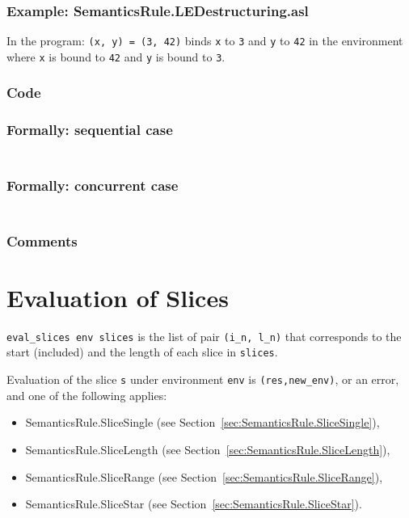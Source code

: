 \documentclass{book}
\begin{document}
    \subsection{Example: SemanticsRule.LEDestructuring.asl}
    In the program:
    \texttt{(x, y) = (3, 42)} binds \texttt{x} to \texttt{3} and \texttt{y} to \texttt{42} in the environment where \texttt{x} is bound to \texttt{42} and \texttt{y} is bound to \texttt{3}.

  \subsection{Code}

  \subsection{Formally: sequential case}
  \begin{align}
  \end{align} 

  \subsection{Formally: concurrent case}
  \begin{align}
  \end{align} 

  \subsection{Comments}

\chapter{Evaluation of Slices \label{chap:eval_slices}}
\texttt{eval\_slices env slices} is the list of pair \texttt{(i\_n, l\_n)} that
corresponds to the start (included) and the length of each slice in
\texttt{slices}.

Evaluation of the slice \texttt{s} under environment \texttt{env} is
\texttt{(res,new\_env)}, or an error, and one of the following applies:
\begin{itemize}
\item SemanticsRule.SliceSingle (see Section~\ref{sec:SemanticsRule.SliceSingle}),
\item SemanticsRule.SliceLength (see Section~\ref{sec:SemanticsRule.SliceLength}),
\item SemanticsRule.SliceRange (see Section~\ref{sec:SemanticsRule.SliceRange}),
\item SemanticsRule.SliceStar (see Section~\ref{sec:SemanticsRule.SliceStar}).
\end{itemize}
\end{document}
